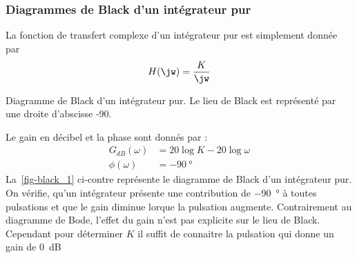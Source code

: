 \subsubsection{Diagrammes de Black d'un intégrateur pur}
La fonction de transfert complexe d'un intégrateur
pur est simplement donnée par
\[
    H(\jw)=\dfrac{K}{\jw}
\]
\begin{marginfigure}
    \centering
    \resizebox{\linewidth}{!}{}
    \caption{Diagramme de Black d'un intégrateur pur. Le lieu de Black
             est représenté par une droite d'abscisse -90\degreeSI.
             \label{fig-black_1}}
\end{marginfigure}
Le gain en décibel et la phase sont donnés par :
\begin{align*}
    G_{dB}(\omega)&=20\log{K}-20\log{\omega} \\
      \phi(\omega)&=-\SI{90}{\degree}
\end{align*}
La~\cref{fig-black_1} ci-contre représente le diagramme de Black d'un 
intégrateur pur. On vérifie, qu'un intégrateur présente une contribution 
de \SI{-90}{\degree} à toutes pulsations et que le gain diminue lorque la
pulsation augmente.
Contrairement au diagramme de Bode, l'effet du gain n'est pas
explicite sur le lieu de Black. Cependant pour déterminer $K$ il suffit de 
connaitre la pulsation qui donne un gain de \SI{0}{\dB}

